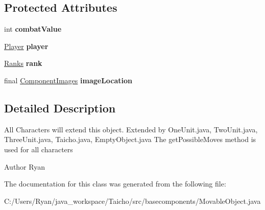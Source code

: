 \subsection*{Protected Attributes}
\begin{DoxyCompactItemize}
\item 
\hypertarget{classbasecomponents_1_1_movable_object_a24f258d9b80495c1fa4b83b9f0ed7023}{int {\bfseries combat\-Value}}\label{classbasecomponents_1_1_movable_object_a24f258d9b80495c1fa4b83b9f0ed7023}

\item 
\hypertarget{classbasecomponents_1_1_movable_object_a38646dc8af832c7b451d5d6fa0b4bc05}{\hyperlink{enumenums_1_1_player}{Player} {\bfseries player}}\label{classbasecomponents_1_1_movable_object_a38646dc8af832c7b451d5d6fa0b4bc05}

\item 
\hypertarget{classbasecomponents_1_1_movable_object_aee5fbab383cbb05bd3ec6c679f363997}{\hyperlink{enumenums_1_1_ranks}{Ranks} {\bfseries rank}}\label{classbasecomponents_1_1_movable_object_aee5fbab383cbb05bd3ec6c679f363997}

\item 
\hypertarget{classbasecomponents_1_1_movable_object_a563bee40670d7e6b46afab99bce847ee}{final \hyperlink{enumenums_1_1_component_images}{Component\-Images} {\bfseries image\-Location}}\label{classbasecomponents_1_1_movable_object_a563bee40670d7e6b46afab99bce847ee}

\end{DoxyCompactItemize}


\subsection{Detailed Description}
All Characters will extend this object. Extended by One\-Unit.\-java, Two\-Unit.\-java, Three\-Unit.\-java, Taicho.\-java, Empty\-Object.\-java The get\-Possible\-Moves method is used for all characters \begin{DoxyAuthor}{Author}
Ryan 
\end{DoxyAuthor}


The documentation for this class was generated from the following file\-:\begin{DoxyCompactItemize}
\item 
C\-:/\-Users/\-Ryan/java\-\_\-workspace/\-Taicho/src/basecomponents/Movable\-Object.\-java\end{DoxyCompactItemize}
